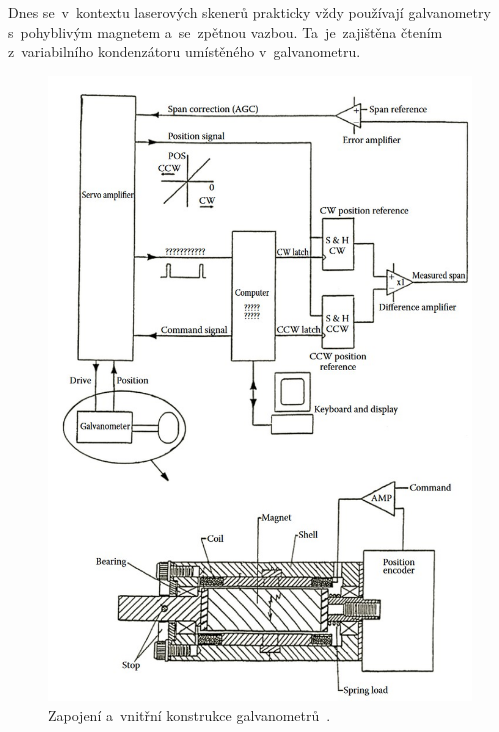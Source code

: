 Dnes se~v~kontextu laserových skenerů prakticky vždy používají galvanometry s~pohyblivým magnetem a~se~zpětnou vazbou. Ta~je~zajištěna čtením z~variabilního kondenzátoru umístěného v~galvanometru.

\begin{figure}[htb]
  \centering
  \includegraphics[width=1\textwidth]{img/galvanometer-detail.jpg}
  \caption{\label{fig:galvanometer-detail} Zapojení a~vnitřní konstrukce galvanometrů~\cite{scanning-handbook}.}
\end{figure}

